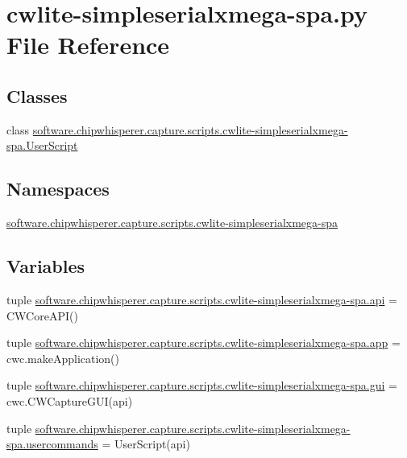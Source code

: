 \hypertarget{cwlite-simpleserialxmega-spa_8py}{}\section{cwlite-\/simpleserialxmega-\/spa.py File Reference}
\label{cwlite-simpleserialxmega-spa_8py}
\subsection*{Classes}
\begin{DoxyCompactItemize}
\item 
class \hyperlink{classsoftware_1_1chipwhisperer_1_1capture_1_1scripts_1_1cwlite-simpleserialxmega-spa_1_1UserScript}{software.\+chipwhisperer.\+capture.\+scripts.\+cwlite-\/simpleserialxmega-\/spa.\+User\+Script}
\end{DoxyCompactItemize}
\subsection*{Namespaces}
\begin{DoxyCompactItemize}
\item 
 \hyperlink{namespacesoftware_1_1chipwhisperer_1_1capture_1_1scripts_1_1cwlite-simpleserialxmega-spa}{software.\+chipwhisperer.\+capture.\+scripts.\+cwlite-\/simpleserialxmega-\/spa}
\end{DoxyCompactItemize}
\subsection*{Variables}
\begin{DoxyCompactItemize}
\item 
tuple \hyperlink{namespacesoftware_1_1chipwhisperer_1_1capture_1_1scripts_1_1cwlite-simpleserialxmega-spa_a516520bd4dcd77d2e1fd5ffbdb0b8d90}{software.\+chipwhisperer.\+capture.\+scripts.\+cwlite-\/simpleserialxmega-\/spa.\+api} = C\+W\+Core\+A\+P\+I()
\item 
tuple \hyperlink{namespacesoftware_1_1chipwhisperer_1_1capture_1_1scripts_1_1cwlite-simpleserialxmega-spa_abf1e3d28260421a60b7ad0882c0c2c36}{software.\+chipwhisperer.\+capture.\+scripts.\+cwlite-\/simpleserialxmega-\/spa.\+app} = cwc.\+make\+Application()
\item 
tuple \hyperlink{namespacesoftware_1_1chipwhisperer_1_1capture_1_1scripts_1_1cwlite-simpleserialxmega-spa_ab5f9c7367f23264ce6feedd951ba8e2a}{software.\+chipwhisperer.\+capture.\+scripts.\+cwlite-\/simpleserialxmega-\/spa.\+gui} = cwc.\+C\+W\+Capture\+G\+U\+I(api)
\item 
tuple \hyperlink{namespacesoftware_1_1chipwhisperer_1_1capture_1_1scripts_1_1cwlite-simpleserialxmega-spa_acd034c3e1d25b120839a7e1bf1fdbed0}{software.\+chipwhisperer.\+capture.\+scripts.\+cwlite-\/simpleserialxmega-\/spa.\+usercommands} = User\+Script(api)
\end{DoxyCompactItemize}
